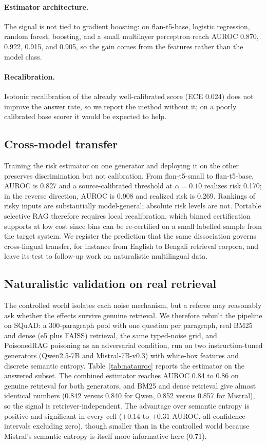 \documentclass[sn-basic]{sn-jnl}
\theoremstyle{thmstyleone}
\theoremstyle{thmstyletwo}
\begin{document}
\paragraph{Estimator architecture.}
The signal is not tied to gradient boosting: on flan-t5-base, logistic
regression, random forest, boosting, and a small multilayer perceptron reach
AUROC 0.870, 0.922, 0.915, and 0.905, so the gain comes from the features rather
than the model class.

\paragraph{Recalibration.}
Isotonic recalibration of the already well-calibrated score (ECE 0.024) does not
improve the answer rate, so we report the method without it; on a poorly
calibrated base scorer it would be expected to help.

\subsection{Cross-model transfer}\label{sec:transfer}
Training the risk estimator on one generator and deploying it on the
other preserves discrimination but not calibration. From flan-t5-small
to flan-t5-base, AUROC is 0.827 and a source-calibrated threshold at
$\alpha = 0.10$ realizes risk 0.170; in the reverse direction, AUROC
is 0.908 and realized risk is 0.269. Rankings of risky inputs are
substantially model-general; absolute risk levels are not. Portable
selective RAG therefore requires local recalibration, which binned
certification supports at low cost since bins can be re-certified on a
small labelled sample from the target system. We register the
prediction that the same dissociation governs cross-lingual transfer,
for instance from English to Bengali retrieval corpora, and leave its
test to follow-up work on naturalistic multilingual data.

\subsection{Naturalistic validation on real retrieval}
\label{sec:naturalistic}
The controlled world isolates each noise mechanism, but a referee may
reasonably ask whether the effects survive genuine retrieval. We
therefore rebuilt the pipeline on SQuAD: a 300-paragraph pool with one
question per paragraph, real BM25 and dense (e5 plus FAISS) retrieval,
the same typed-noise grid, and PoisonedRAG poisoning
\citep{zou2025poisonedrag} as an adversarial condition, run on two
instruction-tuned generators (Qwen2.5-7B and Mistral-7B-v0.3) with
white-box features and discrete semantic entropy.
Table~\ref{tab:natauroc} reports the estimator on the answered subset.
The combined estimator reaches AUROC 0.84 to 0.86 on genuine retrieval
for both generators, and BM25 and dense retrieval give almost identical
numbers (0.842 versus 0.840 for Qwen, 0.852 versus 0.857 for Mistral),
so the signal is retriever-independent. The advantage over semantic
entropy is positive and significant in every cell ($+0.14$ to $+0.31$
AUROC, all confidence intervals excluding zero), though smaller than in
the controlled world because Mistral's semantic entropy is itself more
informative here (0.71).
\end{document}
